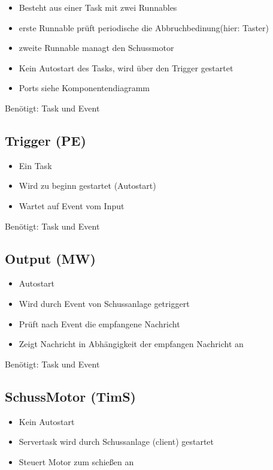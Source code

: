 \documentclass[a4paper,11pt]{scrreprt}
\begin{document}
\begin{itemize}
	\item Besteht aus einer Task mit zwei Runnables
	\item erste Runnable prüft periodische die Abbruchbedinung(hier: Taster)
	\item zweite Runnable managt den Schussmotor
	\item Kein Autostart des Tasks, wird über den Trigger gestartet
	\item Ports siehe Komponentendiagramm
\end{itemize}

Benötigt: Task und Event

\subsection*{Trigger (PE)}

\begin{itemize}
 \item Ein Task
 \item Wird zu beginn gestartet (Autostart)
 \item Wartet auf Event vom Input
\end{itemize}

Benötigt: Task und Event

\subsection*{Output (MW)}

\begin{itemize}
 \item Autostart
 \item Wird durch Event von Schussanlage getriggert
 \item Prüft nach Event die empfangene Nachricht
 \item Zeigt Nachricht in Abhängigkeit der empfangen Nachricht an
\end{itemize}

Benötigt: Task und Event


\subsection*{SchussMotor (TimS)}

\begin{itemize}
 \item Kein Autostart
 \item Servertask wird durch Schussanlage (client) gestartet
 \item Steuert Motor zum schießen an
\end{itemize}
\end{document}
